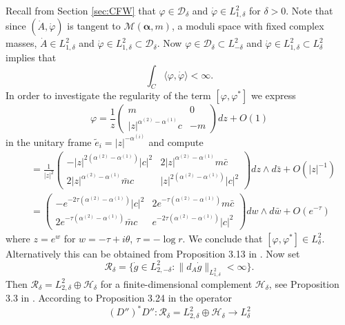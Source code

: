 \documentclass[12pt,letterpaper,reqno]{amsart}
\def\mathbf#1{#1}%
\theoremstyle{remark}
\theoremstyle{definition}
\numberwithin{thm}{section}
\numberwithin{equation}{section}
\numberwithin{figure}{section}
\begin{document}
Recall from Section \ref{sec:CFW} that $\varphi \in \mathcal{D}_\delta$ and $\dot \varphi \in L^2_{1,\delta}$ for $\delta >0$. Note that since $(\dot A, \dot \varphi)$ is tangent to $\mathcal{M}(\boldsymbol{\alpha}, \mathbf{m})$, a moduli space with fixed complex masses, 
 $\dot A \in L^2_{1, \delta}$ and $\dot \varphi \in L^2_{1,\delta} \subset \mathcal{D}_\delta$. Now $\varphi \in \mathcal{D}_\delta \subset L^2_{-\delta}$ and $\dot \varphi \in L^2_{1,\delta} \subset L^2_\delta$ implies that
\[
\int_C \langle \varphi, \dot \varphi \rangle < \infty.
\]
In order to investigate the regularity of the term $[\varphi, \varphi^*]$ we express  
\[
\varphi =\frac{1}{z} \begin{pmatrix}
 m & 0 \\ |z|^{\alpha^{(2)} - \alpha^{(1)}} c & -m	
 \end{pmatrix}
dz + O(1)
\]
in the unitary frame $\tilde e_i = |z|^{-\alpha^{(i)}}$ and compute
\begin{align*}
[\varphi, \varphi^*] &= \frac{1}{|z|^2} \begin{pmatrix}
 - |z|^{2(\alpha^{(2)} - \alpha^{(1)})}	|c|^2 & 2 |z|^{\alpha^{(2)}-\alpha^{(1)}} m \bar c\\
 2 |z|^{\alpha^{(2)}-\alpha^{(1)}} \bar m c  &|z|^{2(\alpha^{(2)} - \alpha^{(1)})}	|c|^2
 \end{pmatrix} dz \wedge d \bar z
+O(|z|^{-1})\\
&=  \begin{pmatrix}
 - e^{-2 \tau (\alpha^{(2)}- \alpha^{(1)})}	|c|^2& 2 e^{-\tau(\alpha^{(2)}-\alpha^{(1)})}  m \bar c\\
 2 e^{-\tau(\alpha^{(2)}-\alpha^{(1)})}  \bar m c & 	e^{-2 \tau (\alpha^{(2)} - \alpha^{(1)})} |c|^2
 \end{pmatrix} d w \wedge d \bar w
+O(e^{-\tau})
\end{align*}
where $z=e^w$ for $w = - \tau + i \theta$, $\tau = - \log r$. We conclude that $[\varphi, \varphi^*] \in L^2_\delta$. Alternatively this can be obtained from Proposition 3.13 in \cite{collier2024conformallimitsparabolicslnchiggs}. Now set 
\[
\mathcal{R}_\delta = \{ \dot g \in L^2_{2,-\delta} : \|d_A \dot g \|_{L^2_{1, \delta}} < \infty \}. 
\]
Then $\mathcal{R}_\delta = L^2_{2, \delta} \oplus \mathcal{H}_\delta$ for a finite-dimensional complement $\mathcal{H}_\delta$, see Proposition 3.3 in \cite{collier2024conformallimitsparabolicslnchiggs}. According to Proposition 3.24 in \cite{collier2024conformallimitsparabolicslnchiggs} the operator
\[
(D'')^*D'' : \mathcal{R}_\delta= L^2_{2, \delta} \oplus \mathcal{H}_\delta  \longrightarrow L^2_\delta
\]
\end{document}

